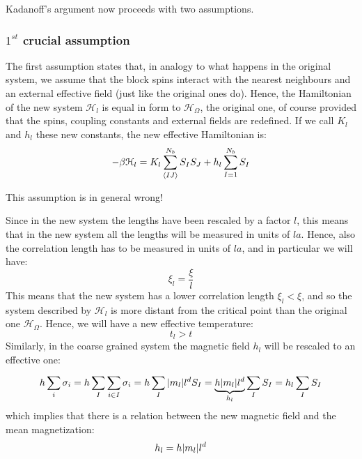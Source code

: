 \documentclass[../main/main.tex]{subfiles}
\begin{document}
\noindent Kadanoff's argument now proceeds with two assumptions.

\subsubsection{\(  1^{st} \) crucial assumption}
The first assumption states that, in analogy to what happens in the original system, we assume that the block spins interact with the nearest neighbours and an external effective field (just like the original ones do). Hence, the Hamiltonian of the new system \( \mathcal{H}_l \) is equal in form to \( \mathcal{H}_ \Omega  \), the original one, of course provided that the spins, coupling constants and external fields are redefined.  If we call \( K_l \)  and \( h_l \) these new constants, the new effective Hamiltonian is:
\begin{equation}
  - \beta \mathcal{H}_l = K_l \sum_{\expval{IJ} }^{N_b} S_I S_J  + h_l \sum_{I=1}^{N_b} S_I
\end{equation}
\begin{remark}
This assumption is in general wrong!
\end{remark}
Since in the new system the lengths have been rescaled by a factor \( l \), this
means that in the new system all the lengths will be measured in units of \( la \).  Hence, also the correlation length  has to be measured in units of \( la \), and in particular we will have:
\begin{equation*}
  \xi _l = \frac{\xi }{l}
\end{equation*}
This means that the new system has a lower correlation length \( \xi _l < \xi  \), and so the system described by \( \mathcal{H}_l \)   is more distant from the critical point than the original one \( \mathcal{H}_{\Omega }\). Hence, we will have a new effective temperature:
\begin{equation*}
  t_l > t
\end{equation*}
 Similarly, in the coarse grained system the magnetic field \( h_l \) will be rescaled to an effective one:
\begin{equation*}
  h \sum_{i}^{} \sigma _i = h \sum_{I}^{} \sum_{i \in I}^{}  \sigma _i = h \sum_{I}^{}    \abs{m_l} l^d S_I
  = \underbrace{h \abs{m_l} l^d}_{h_l} \sum_{I}^{} S_I = h_l \sum_{I}^{} S_I
\end{equation*}
which implies that there is a relation between the new magnetic field and the mean magnetization:
\begin{equation*}
  h_l = h \abs{m_l} l^d
\end{equation*}
\end{document}

